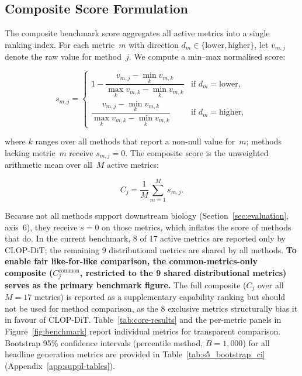 \documentclass[biology,article,submit,pdftex,moreauthors]{Definitions/mdpi}
\begin{document}
\subsection{Composite Score Formulation}\label{sec:composite}

The composite benchmark score aggregates all active metrics into a single ranking index. For each metric~$m$ with direction $d_m \in \{\text{lower}, \text{higher}\}$, let $v_{m,j}$ denote the raw value for method~$j$. We compute a min--max normalised score:
\begin{linenomath}
\begin{equation}
  s_{m,j} =
  \begin{cases}
    1 - \dfrac{v_{m,j} - \min_k v_{m,k}}{\max_k v_{m,k} - \min_k v_{m,k}} & \text{if } d_m = \text{lower},\\[6pt]
    \dfrac{v_{m,j} - \min_k v_{m,k}}{\max_k v_{m,k} - \min_k v_{m,k}} & \text{if } d_m = \text{higher},
  \end{cases}
  \label{eq:norm}
\end{equation}
\end{linenomath}
where $k$ ranges over all methods that report a non-null value for~$m$; methods lacking metric~$m$ receive $s_{m,j} = 0$. The composite score is the unweighted arithmetic mean over all~$M$ active metrics:
\begin{linenomath}
\begin{equation}
  C_j = \frac{1}{M}\sum_{m=1}^{M} s_{m,j}.
  \label{eq:composite}
\end{equation}
\end{linenomath}
Because not all methods support downstream biology (Section~\ref{sec:evaluation}, axis~6), they receive $s = 0$ on those metrics, which inflates the score of methods that do. In the current benchmark, 8 of 17 active metrics are reported only by CLOP-DiT; the remaining 9 distributional metrics are shared by all methods. \textbf{To enable fair like-for-like comparison, the common-metrics-only composite ($C_j^{\text{common}}$, restricted to the 9 shared distributional metrics) serves as the primary benchmark figure.} The full composite ($C_j$ over all $M = 17$ metrics) is reported as a supplementary capability ranking but should not be used for method comparison, as the 8 exclusive metrics structurally bias it in favour of CLOP-DiT. Table~\ref{tab:core-results} and the per-metric panels in Figure~\ref{fig:benchmark} report individual metrics for transparent comparison. Bootstrap 95\% confidence intervals (percentile method, $B{=}1{,}000$) for all headline generation metrics are provided in Table~\ref{tab:s5_bootstrap_ci} (Appendix~\ref{app:suppl-tables}).
\end{document}
